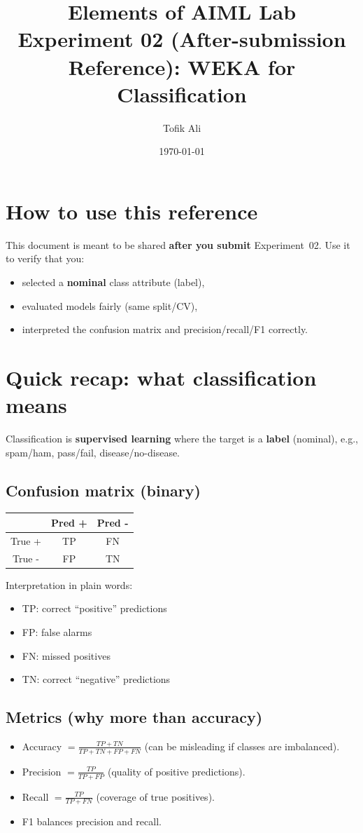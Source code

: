 \documentclass[11pt]{article}
\title{Elements of AIML Lab\\Experiment 02 (After-submission Reference): WEKA for Classification}
\author{Tofik Ali}
\date{\today}
\begin{document}
\maketitle
\tableofcontents

\section{How to use this reference}
This document is meant to be shared \textbf{after you submit} Experiment~02.
Use it to verify that you:
\begin{itemize}[leftmargin=*]
  \item selected a \textbf{nominal} class attribute (label),
  \item evaluated models fairly (same split/CV),
  \item interpreted the confusion matrix and precision/recall/F1 correctly.
\end{itemize}

\section{Quick recap: what classification means}
Classification is \textbf{supervised learning} where the target is a \textbf{label} (nominal), e.g., spam/ham, pass/fail, disease/no-disease.

\subsection{Confusion matrix (binary)}
\begin{center}
\begin{tabular}{c|cc}
  & Pred + & Pred - \\\hline
  True + & TP & FN \\
  True - & FP & TN \\
\end{tabular}
\end{center}
Interpretation in plain words:
\begin{itemize}[leftmargin=*]
  \item TP: correct ``positive'' predictions
  \item FP: false alarms
  \item FN: missed positives
  \item TN: correct ``negative'' predictions
\end{itemize}

\subsection{Metrics (why more than accuracy)}
\begin{itemize}[leftmargin=*]
  \item Accuracy $= \frac{TP+TN}{TP+TN+FP+FN}$ (can be misleading if classes are imbalanced).
  \item Precision $= \frac{TP}{TP+FP}$ (quality of positive predictions).
  \item Recall $= \frac{TP}{TP+FN}$ (coverage of true positives).
  \item F1 balances precision and recall.
\end{itemize}
\end{document}
